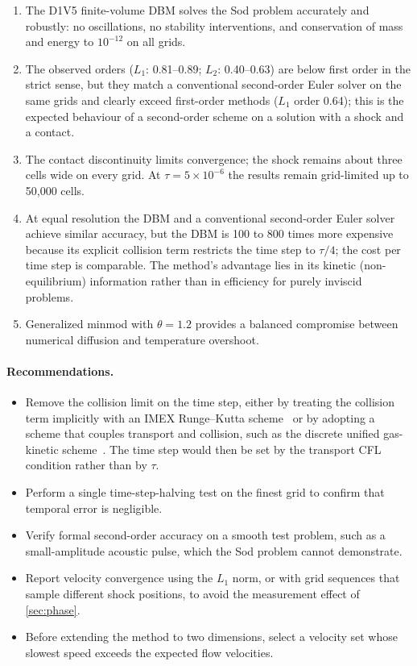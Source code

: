 \documentclass[11pt]{article}
\begin{document}
\begin{enumerate}
  \item The D1V5 finite-volume DBM solves the Sod problem accurately and robustly: no
        oscillations, no stability interventions, and conservation of mass and energy to
        $10^{-12}$ on all grids.
  \item The observed orders ($L_1$: 0.81--0.89; $L_2$: 0.40--0.63) are below first order in
        the strict sense, but they match a conventional second-order Euler solver on the same
        grids and clearly exceed first-order methods ($L_1$ order 0.64); this is the expected
        behaviour of a second-order scheme on a solution with a shock and a contact.
  \item The contact discontinuity limits convergence; the shock remains about three cells
        wide on every grid.  At $\tau = 5\times10^{-6}$ the results remain grid-limited up to
        50{,}000 cells.
  \item At equal resolution the DBM and a conventional second-order Euler solver achieve
        similar accuracy, but the DBM is 100 to 800 times more expensive because its
        explicit collision term restricts the time step to $\tau/4$; the cost per time step
        is comparable.  The method's advantage lies in
        its kinetic (non-equilibrium) information rather than in efficiency for purely
        inviscid problems.
  \item Generalized minmod with $\theta = 1.2$ provides a balanced compromise between
        numerical diffusion and temperature overshoot.
\end{enumerate}

\paragraph{Recommendations.}
\begin{itemize}
  \item Remove the collision limit on the time step, either by treating the collision term
        implicitly with an IMEX Runge--Kutta scheme~\citep{PareschiRusso2005} or by adopting
        a scheme that couples transport and collision, such as the discrete unified
        gas-kinetic scheme~\citep{Guo2013}.  The time step would then be set by the transport
        CFL condition rather than by $\tau$.
  \item Perform a single time-step-halving test on the finest grid to confirm that temporal
        error is negligible.
  \item Verify formal second-order accuracy on a smooth test problem, such as a
        small-amplitude acoustic pulse, which the Sod problem cannot demonstrate.
  \item Report velocity convergence using the $L_1$ norm, or with grid sequences that sample
        different shock positions, to avoid the measurement effect of \cref{sec:phase}.
  \item Before extending the method to two dimensions, select a velocity set whose slowest
        speed exceeds the expected flow velocities.
\end{itemize}
\end{document}
